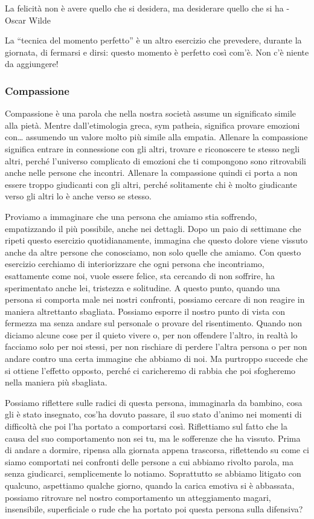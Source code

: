\documentclass[12pt]{book} %
\begin{document}
La felicità non è avere quello che si desidera, ma desiderare quello che si ha - Oscar Wilde 

La “tecnica del momento perfetto” è un altro esercizio che prevedere, durante la giornata, di fermarsi e dirsi: questo
momento è perfetto così com'è. Non c'è niente da aggiungere!

\subsubsection{Compassione}
Compassione è una parola che nella nostra società assume un significato simile alla pietà. Mentre
dall'etimologia greca, sym patheia, significa provare emozioni con… assumendo un valore molto più
simile alla empatia. Allenare la compassione significa entrare in connessione con gli altri, trovare e riconoscere te
stesso negli altri, perché l'universo complicato di emozioni che ti compongono sono ritrovabili
anche nelle persone che incontri. Allenare la compassione quindi ci porta a non essere troppo giudicanti con gli altri,
perché solitamente chi è molto giudicante verso gli altri lo è anche verso se stesso.

Proviamo a immaginare che una persona che amiamo stia soffrendo, empatizzando il più possibile, anche nei dettagli. Dopo
un paio di settimane che ripeti questo esercizio quotidianamente, immagina che questo dolore viene vissuto anche da
altre persone che conosciamo, non solo quelle che amiamo. Con questo esercizio cerchiamo di interiorizzare che ogni
persona che incontriamo, esattamente come noi, vuole essere felice, sta cercando di non soffrire, ha sperimentato anche
lei, tristezza e solitudine. A questo punto, quando una persona si comporta male nei nostri confronti, possiamo cercare
di non reagire in maniera altrettanto sbagliata. Possiamo esporre il nostro punto di vista con fermezza ma senza andare
sul personale o provare del risentimento. Quando non diciamo alcune cose per il quieto vivere o, per non offendere
l'altro, in realtà lo facciamo solo per noi stessi, per non rischiare di perdere l'altra persona o per non andare
contro una certa immagine che abbiamo di noi. Ma purtroppo succede che si ottiene l'effetto opposto, perché ci
caricheremo di rabbia che poi sfogheremo nella maniera più sbagliata.

Possiamo riflettere sulle radici di questa persona, immaginarla da bambino, cosa gli è stato insegnato,
cos'ha dovuto passare, il suo stato d'animo nei momenti di difficoltà che poi
l'ha portato a comportarsi così. Riflettiamo sul fatto che la causa del suo comportamento non sei
tu, ma le sofferenze che ha vissuto. Prima di andare a dormire, ripensa alla giornata appena trascorsa, riflettendo su
come ci siamo comportati nei confronti delle persone a cui abbiamo rivolto parola, ma senza giudicarci, semplicemente
lo notiamo. Soprattutto se abbiamo litigato con qualcuno, aspettiamo qualche giorno, quando la carica emotiva si è
abbassata, possiamo ritrovare nel nostro comportamento un atteggiamento magari, insensibile, superficiale o rude che ha
portato poi questa persona sulla difensiva?
\end{document}
